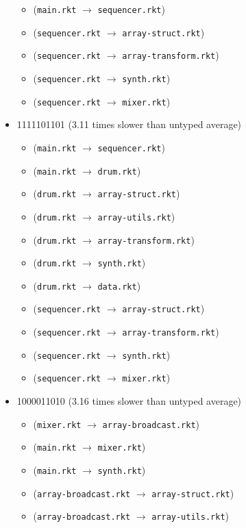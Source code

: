 \documentclass{article}
\newcommand{\mono}[1]{\texttt{#1}}
\begin{document}
\begin{itemize}
\begin{itemize}
  \item (\mono{main.rkt} $\rightarrow$ \mono{sequencer.rkt})
  \item (\mono{sequencer.rkt} $\rightarrow$ \mono{array-struct.rkt})
  \item (\mono{sequencer.rkt} $\rightarrow$ \mono{array-transform.rkt})
  \item (\mono{sequencer.rkt} $\rightarrow$ \mono{synth.rkt})
  \item (\mono{sequencer.rkt} $\rightarrow$ \mono{mixer.rkt})
  \end{itemize}
\item 1111101101 (3.11 times slower than untyped average)
  \begin{itemize}
  \item (\mono{main.rkt} $\rightarrow$ \mono{sequencer.rkt})
  \item (\mono{main.rkt} $\rightarrow$ \mono{drum.rkt})
  \item (\mono{drum.rkt} $\rightarrow$ \mono{array-struct.rkt})
  \item (\mono{drum.rkt} $\rightarrow$ \mono{array-utils.rkt})
  \item (\mono{drum.rkt} $\rightarrow$ \mono{array-transform.rkt})
  \item (\mono{drum.rkt} $\rightarrow$ \mono{synth.rkt})
  \item (\mono{drum.rkt} $\rightarrow$ \mono{data.rkt})
  \item (\mono{sequencer.rkt} $\rightarrow$ \mono{array-struct.rkt})
  \item (\mono{sequencer.rkt} $\rightarrow$ \mono{array-transform.rkt})
  \item (\mono{sequencer.rkt} $\rightarrow$ \mono{synth.rkt})
  \item (\mono{sequencer.rkt} $\rightarrow$ \mono{mixer.rkt})
  \end{itemize}
\item 1000011010 (3.16 times slower than untyped average)
  \begin{itemize}
  \item (\mono{mixer.rkt} $\rightarrow$ \mono{array-broadcast.rkt})
  \item (\mono{main.rkt} $\rightarrow$ \mono{mixer.rkt})
  \item (\mono{main.rkt} $\rightarrow$ \mono{synth.rkt})
  \item (\mono{array-broadcast.rkt} $\rightarrow$ \mono{array-struct.rkt})
  \item (\mono{array-broadcast.rkt} $\rightarrow$ \mono{array-utils.rkt})

\end{itemize}
\end{itemize}
\end{document}
